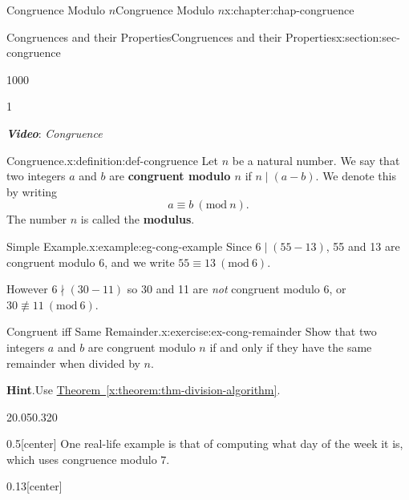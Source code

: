 \documentclass[oneside,10pt,]{book}
\newcommand{\blocktitlefont}{\relax}
\newcommand{\xreffont}{\relax}
\newcommand{\alert}[1]{\textbf{\textit{#1}}}
\newcommand{\terminology}[1]{\textbf{#1}}
\numberwithin{equation}{section}
\newcommand{\Mod}[1]{\ \left(\mathrm{mod}\ #1\right)}
\begin{document}
\begin{chapterptx}{Congruence Modulo \(n\)}{}{Congruence Modulo \(n\)}{}{}{x:chapter:chap-congruence}
\begin{sectionptx}{Congruences and their Properties}{}{Congruences and their Properties}{}{}{x:section:sec-congruence}
\begin{sidebyside}{1}{0}{0}{0}
\begin{sbspanel}{1}
\end{sbspanel}%
\end{sidebyside}%
\par
\alert{Video}: \emph{Congruence}%
\begin{definition}{Congruence.}{x:definition:def-congruence}%
Let \(n\) be a natural number. We say that two integers \(a\) and \(b\) are \terminology{congruent modulo \(n\)} if \(n \mid (a-b)\). We denote this by writing%
\begin{equation*}
a \equiv b \Mod{n}\text{.}
\end{equation*}
The number \(n\) is called the \terminology{modulus}. \label{g:notation:id535227}%
\end{definition}
\begin{example}{Simple Example.}{x:example:eg-cong-example}%
Since \(6 \mid (55-13)\), 55 and 13 are congruent modulo 6, and we write \(55 \equiv 13 \Mod{6}\).%
\par
However \(6 \nmid (30-11)\) so 30 and 11 are \emph{not} congruent modulo 6, or \(30 \not\equiv 11 \Mod{6}\).%
\end{example}
\begin{inlineexercise}{Congruent iff Same Remainder.}{x:exercise:ex-cong-remainder}%
Show that two integers \(a\) and \(b\) are congruent modulo \(n\) if and only if they have the same remainder when divided by \(n\).%
\par\smallskip%
\noindent\textbf{\blocktitlefont Hint}.\hypertarget{g:hint:id535301}{}\quad{}Use \hyperref[x:theorem:thm-division-algorithm]{Theorem~{\xreffont\ref{x:theorem:thm-division-algorithm}}}.%
\end{inlineexercise}%
\begin{sidebyside}{2}{0.05}{0.32}{0}%
\begin{sbspanel}{0.5}[center]%
One real-life example is that of computing what day of the week it is, which uses congruence modulo \(7\).%
\end{sbspanel}%
\begin{sbspanel}{0.13}[center]%

\end{sbspanel}
\end{sidebyside}
\end{sectionptx}
\end{chapterptx}
\end{document}
